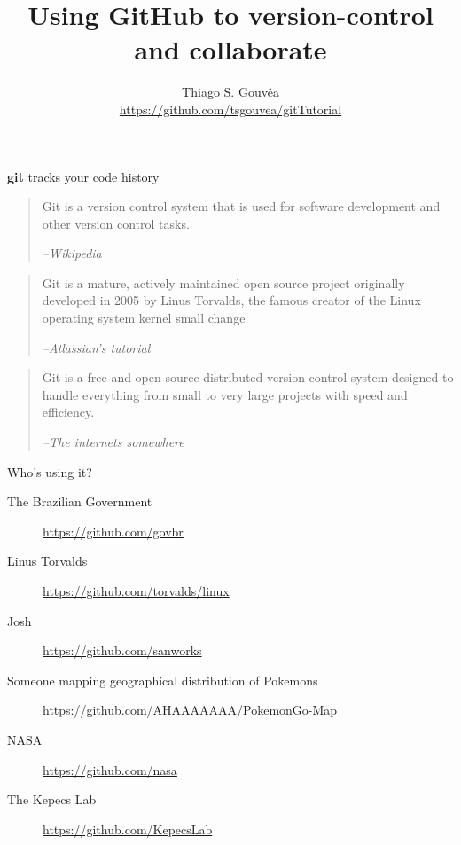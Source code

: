 \documentclass[11pt]{beamer}
\author{Thiago S. Gouvêa \\ \vspace{1cm} \url{https://github.com/tsgouvea/gitTutorial}}
\title{Using GitHub to version-control and collaborate}
\begin{document}
\begin{frame}
\titlepage
\end{frame}


\begin{frame}{\textbf{git} tracks your code history}
\begin{quote}
Git is a version control system that is used for software development and other version control tasks.
\begin{flushright}
\textit{--Wikipedia}
\end{flushright}
\end{quote}
\begin{quote}
Git is a mature, actively maintained open source project originally developed in 2005 by Linus Torvalds, the famous creator of the Linux operating system kernel
small change
\begin{flushright}
\textit{--Atlassian's tutorial}
\end{flushright}
\end{quote}
\begin{quote}
Git is a free and open source distributed version control system designed to handle everything from small to very large projects with speed and efficiency.
\begin{flushright}
\textit{--The internets somewhere}
\end{flushright}
\end{quote}
\end{frame}

\begin{frame}{Who's using it?}
\begin{description}
\item[The Brazilian Government]{\url{https://github.com/govbr}} \\ \pause
\item[Linus Torvalds]{\url{https://github.com/torvalds/linux}} \\ \pause
\item[Josh]{\url{https://github.com/sanworks}} \pause
\item[Someone mapping geographical distribution of Pokemons]{\url{https://github.com/AHAAAAAAA/PokemonGo-Map}} \pause
\item[NASA]{\url{https://github.com/nasa}} \\ \pause
\item[The Kepecs Lab]{\url{https://github.com/KepecsLab}}
\end{description}
\end{frame}
\end{document}
